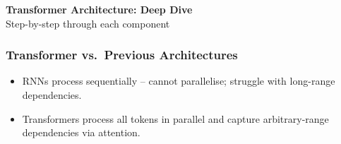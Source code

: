 
\begin{frame}[fragile]\frametitle{}
\begin{center}
{\Large \textbf{Transformer Architecture: Deep Dive}}\\[0.5em]
{\normalsize Step-by-step through each component}
\end{center}
\end{frame}





\begin{frame}[fragile]\frametitle{Transformer vs.\ Previous Architectures}

\begin{itemize}
\item RNNs process sequentially – cannot parallelise; struggle with long-range dependencies.
\item Transformers process all tokens in parallel and capture arbitrary-range dependencies via attention.
\end{itemize}



\end{frame}


